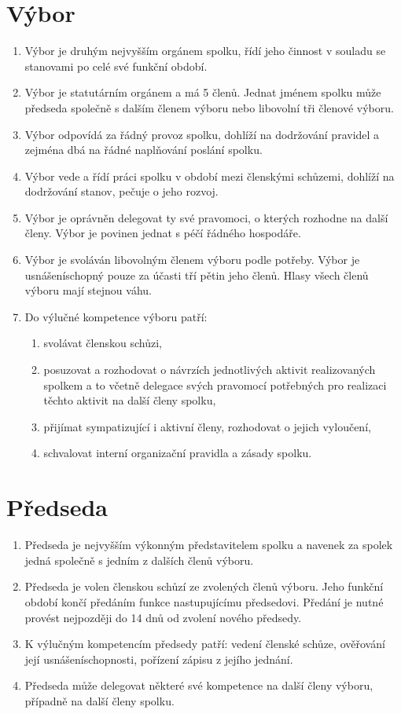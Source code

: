 \documentclass[11pt]{article}
\begin{document}
\section{Výbor}
\begin{enumerate}
\item Výbor je druhým nejvyšším orgánem spolku, řídí jeho činnost v souladu se stanovami po celé své funkční období. 
\item Výbor je statutárním orgánem a má 5 členů. Jednat jménem spolku může předseda společně s dalším členem výboru nebo libovolní tři členové výboru.
\item Výbor odpovídá za řádný provoz spolku, dohlíží na dodržování pravidel a zejména dbá na řádné naplňování poslání spolku.
\item Výbor vede a řídí práci spolku v období mezi členskými schůzemi, dohlíží na dodržování stanov, pečuje o jeho rozvoj.
\item Výbor je oprávněn delegovat ty své pravomoci, o kterých rozhodne na další členy. Výbor je povinen jednat s péčí řádného hospodáře. 
\item Výbor je svoláván libovolným členem výboru podle potřeby. Výbor je usnášeníschopný pouze za účasti tří pětin jeho členů. Hlasy všech členů výboru mají stejnou váhu.
\item Do výlučné kompetence výboru patří: 
\begin{enumerate}
\item svolávat členskou schůzi, 
\item posuzovat a rozhodovat o návrzích jednotlivých aktivit realizovaných spolkem a to včetně delegace svých pravomocí potřebných pro realizaci těchto aktivit na další členy spolku,
\item přijímat sympatizující i aktivní členy, rozhodovat o jejich vyloučení,
\item schvalovat interní organizační pravidla a zásady spolku.
\end{enumerate}
\end{enumerate}

\section{Předseda}
\begin{enumerate}
\item Předseda je nejvyšším výkonným představitelem spolku a navenek za spolek jedná společně s jedním z dalších členů výboru.  
\item Předseda je volen členskou schůzí ze zvolených členů výboru. Jeho funkční období končí předáním funkce nastupujícímu předsedovi. Předání je nutné provést nejpozději do 14 dnů od zvolení nového předsedy. 
\item K výlučným kompetencím předsedy patří: vedení členské schůze, ověřování její usnášeníschopnosti, pořízení zápisu z jejího jednání.
\item Předseda může delegovat některé své kompetence na další členy výboru, případně na další členy spolku.
\end{enumerate}
\end{document}
